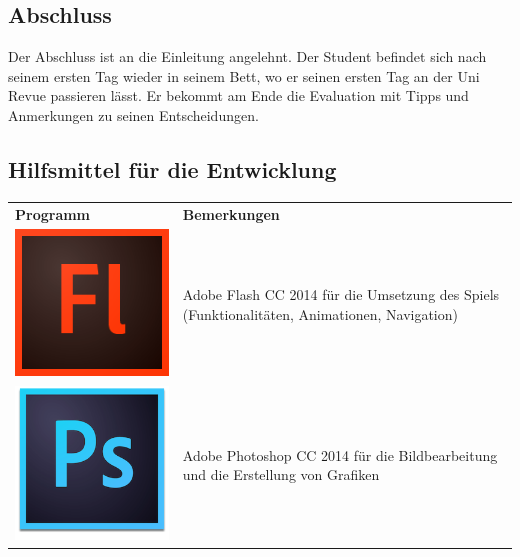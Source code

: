 \documentclass[a4paper, 11pt]{article} %
\begin{document}
\subsection{Abschluss}
Der Abschluss ist an die Einleitung angelehnt. Der Student befindet sich nach seinem ersten Tag wieder in seinem Bett, wo er seinen ersten Tag an der Uni Revue passieren lässt. Er bekommt am Ende die Evaluation mit Tipps und Anmerkungen zu seinen Entscheidungen. 

\subsection{Hilfsmittel für die Entwicklung}
\begin{tabular}{lp{9cm}}
\textbf{Programm} & \textbf{Bemerkungen} \\ 
\includegraphics[scale=0.35]{images/flash.png} & 
\nohyphens{
Adobe Flash CC 2014 für die Umsetzung des Spiels
(Funktionalitäten, Animationen, Navigation)
} \\
\includegraphics[scale=0.5]{images/photoshop.png} & 
\nohyphens{
Adobe Photoshop CC 2014 für die Bildbearbeitung und die Erstellung von Grafiken
} \\

\end{tabular}
\end{document}
